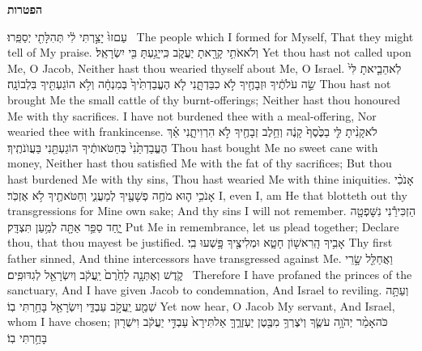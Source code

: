 \vspace{24pt}\LARGE \textbf{הפטרות} \normalsize\vspace{-16pt}
\label{haft_24}
\setcounter{chap}{43}
\setcounter{verse}{21}
{עַם\maqqaf זוּ֙ יָצַ֣רְתִּי לִ֔י תְּהִלָּתִ֖י יְסַפֵּֽרוּ׃ \setuma }
{The people which I formed for Myself, That they might tell of My praise.}
{וְלֹא\maqqaf אֹתִ֥י קָרָ֖אתָ יַעֲקֹ֑ב כִּֽי\maqqaf יָגַ֥עְתָּ בִּ֖י יִשְׂרָאֵֽל׃}
{Yet thou hast not called upon Me, O Jacob, Neither hast thou wearied thyself about Me, O Israel.}
{לֹֽא\maqqaf הֵבֵ֤יאתָ לִּי֙ שֵׂ֣ה עֹלֹתֶ֔יךָ וּזְבָחֶ֖יךָ לֹ֣א כִבַּדְתָּ֑נִי לֹ֤א הֶעֱבַדְתִּ֙יךָ֙ בְּמִנְחָ֔ה וְלֹ֥א הוֹגַעְתִּ֖יךָ בִּלְבוֹנָֽה׃}
{Thou hast not brought Me the small cattle of thy burnt-offerings; Neither hast thou honoured Me with thy sacrifices. I have not burdened thee with a meal-offering, Nor wearied thee with frankincense.}
{לֹא\maqqaf קָנִ֨יתָ לִּ֤י בַכֶּ֙סֶף֙ קָנֶ֔ה וְחֵ֥לֶב זְבָחֶ֖יךָ לֹ֣א הִרְוִיתָ֑נִי אַ֗ךְ הֶעֱבַדְתַּ֙נִי֙ בְּחַטֹּאותֶ֔יךָ הוֹגַעְתַּ֖נִי בַּעֲוֺנֹתֶֽיךָ׃}
{Thou hast bought Me no sweet cane with money, Neither hast thou satisfied Me with the fat of thy sacrifices; But thou hast burdened Me with thy sins, Thou hast wearied Me with thine iniquities.}
{אָנֹכִ֨י אָנֹכִ֥י ה֛וּא מֹחֶ֥ה פְשָׁעֶ֖יךָ לְמַעֲנִ֑י וְחַטֹּאתֶ֖יךָ לֹ֥א אֶזְכֹּֽר׃}
{I, even I, am He that blotteth out thy transgressions for Mine own sake; And thy sins I will not remember.}
{הַזְכִּירֵ֕נִי נִשָּׁפְטָ֖ה יָ֑חַד סַפֵּ֥ר אַתָּ֖ה לְמַ֥עַן תִּצְדָּֽק׃}
{Put Me in remembrance, let us plead together; Declare thou, that thou mayest be justified.}
{אָבִ֥יךָ הָֽרִאשׁ֖וֹן חָטָ֑א וּמְלִיצֶ֖יךָ פָּ֥שְׁעוּ בִֽי׃}
{Thy first father sinned, And thine intercessors have transgressed against Me.}
{וַאֲחַלֵּ֖ל שָׂ֣רֵי קֹ֑דֶשׁ וְאֶתְּנָ֤ה לַחֵ֙רֶם֙ יַֽעֲקֹ֔ב וְיִשְׂרָאֵ֖ל לְגִדּוּפִֽים׃ \petucha }
{Therefore I have profaned the princes of the sanctuary, And I have given Jacob to condemnation, And Israel to reviling.}
\newperek
{}
{וְעַתָּ֥ה שְׁמַ֖ע יַֽעֲקֹ֣ב עַבְדִּ֑י וְיִשְׂרָאֵ֖ל בָּחַ֥רְתִּי בֽוֹ׃}
{Yet now hear, O Jacob My servant, And Israel, whom I have chosen;}
{כֹּה\maqqaf אָמַ֨ר יְהֹוָ֥ה עֹשֶׂ֛ךָ וְיֹצֶרְךָ֥ מִבֶּ֖טֶן יַעְזְרֶ֑ךָּ אַל\maqqaf תִּירָא֙ עַבְדִּ֣י יַעֲקֹ֔ב וִישֻׁר֖וּן בָּחַ֥רְתִּי בֽוֹ׃}

